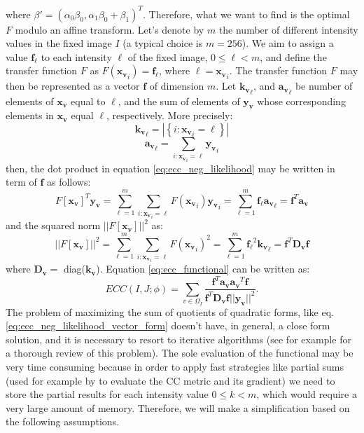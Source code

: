 where $\beta' = (\alpha_{0}\beta_{0}, \alpha_{1}\beta_{0} + \beta_{1})^{T}$. Therefore, what we want to find is the optimal $F$ modulo an affine transform. Let's denote by $m$ the number of different intensity values in the fixed image $I$ (a typical choice is $m=256$). We aim to assign a value $\mathbf{f}_{\ell}$ to each intensity $\ell$ of the fixed image, $0\leq \ell < m$, and define the transfer function $F$ as $F(\mathbf{x_{v}}_{i}) = \mathbf{f}_{\ell}$, where $\ell = \mathbf{x_{v}}_{i}$. The transfer function $F$ may then be represented as a vector $\mathbf{f}$ of dimension $m$. Let $\mathbf{k_{v}}_{\ell}$, and $\mathbf{a_{v}}_{\ell}$ be number of elements of $\mathbf{x_{v}}$ equal to $\ell$, and the sum of elements of $\mathbf{y_{v}}$ whose corresponding elements in $\mathbf{x_{v}}$ equal $\ell$, respectively. More precisely:
\begin{displaymath}
    \mathbf{k_{v}}_{\ell} = |\left\lbrace i : \mathbf{x_{v}}_{i}=\ell \right\rbrace|
\end{displaymath}
\begin{displaymath}
    \mathbf{a_{v}}_{\ell} = \sum_{i:\mathbf{x_{v}}_{i}=\ell} \mathbf{y_{v}}_{i}
\end{displaymath}
then, the dot product in equation \eqref{eq:ecc_neg_likelihood} may be written in term of $\mathbf{f}$ as follows:
\begin{displaymath}
    F\left[\mathbf{x_{v}}\right]^{T} \mathbf{y_{v}} = \sum_{\ell=1}^{m} \sum_{i:\mathbf{x_{v}}_{i}=\ell} F(\mathbf{x_{v}}_{i})\mathbf{y_{v}}_{i}
    =\sum_{\ell=1}^{m} \mathbf{f_{\ell}}\mathbf{a_{v}}_{\ell} = \mathbf{f}^{T}\mathbf{a_{v}}
\end{displaymath}
and the squared norm $||F[\mathbf{x_{v}}]||^{2}$ as:
\begin{displaymath}
    ||F\left[\mathbf{x_{v}}\right]||^{2} = \sum_{\ell=1}^{m} \sum_{i:\mathbf{x_{v}}_{i}=\ell} F(\mathbf{x_{v}}_{i})^{2}
    = \sum_{\ell=1}^{m} \mathbf{f_{\ell}}^{2} \mathbf{k_{v}}_{\ell} = \mathbf{f}^{T} \mathbf{D_{v}} \mathbf{f}
\end{displaymath}
where $\mathbf{D_{v}} = $ diag($\mathbf{k_{v}}$). Equation \eqref{eq:ecc_functional} can be written as:
\begin{equation}\label{eq:ecc_neg_likelihood_vector_form}
    ECC(I, J;\phi) = \sum_{v\in\Omega_{I}}\frac{\mathbf{f}^{T}\mathbf{a_{v}}\mathbf{a_{v}}^{T}\mathbf{f}}
    {\mathbf{f}^{T} \mathbf{D_{v}} \mathbf{f}||\mathbf{y_{v}}||^{2}}.
\end{equation}
The problem of maximizing the sum of quotients of quadratic forms, like eq. \eqref{eq:ecc_neg_likelihood_vector_form} doesn't have, in general, a close form solution, and it is necessary to resort to iterative algorithms (see for example \cite{Kiers1995} for a thorough review of this problem). The sole evaluation of the functional may be very time consuming because in order to apply fast strategies like partial sums (used for example by \cite{Avants2008} to evaluate the CC metric and its gradient) we need to store the partial results for each intensity value $0 \leq k < m$, which would require a very large amount of memory. Therefore, we will make a simplification based on the following assumptions. \\
